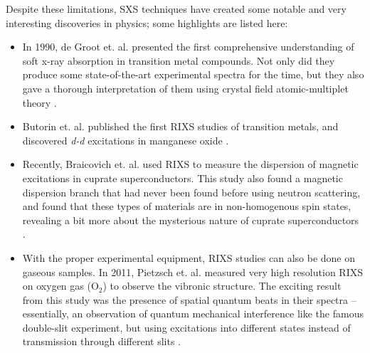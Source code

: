 Despite these limitations, SXS techniques have created some notable and very interesting discoveries in physics; some highlights are listed here:
\begin{itemize}
\item In 1990, de Groot et. al. presented the first comprehensive understanding of soft x-ray absorption in transition metal compounds.  Not only did they produce some state-of-the-art experimental spectra for the time, but they also gave a thorough interpretation of them using crystal field atomic-multiplet theory \cite{deG90}.

\item Butorin et. al. published the first RIXS studies of transition metals, and discovered \emph{d-d} excitations in manganese oxide \cite{But96}.

\item Recently, Braicovich et. al. used RIXS to measure the dispersion of magnetic excitations in cuprate superconductors.  This study also found a magnetic dispersion branch that had never been found before using neutron scattering, and found that these types of materials are in non-homogenous spin states, revealing a bit more about the mysterious nature of cuprate superconductors \cite{Bra10}.

\item With the proper experimental equipment, RIXS studies can also be done on gaseous samples.  In 2011, Pietzsch et. al. measured very high resolution RIXS on oxygen gas (O$_2$) to observe the vibronic structure.  The exciting result from this study was the presence of spatial quantum beats in their spectra -- essentially, an observation of quantum mechanical interference like the famous double-slit experiment, but using excitations into different states instead of transmission through different slits \cite{Pie11}.
\end{itemize}

